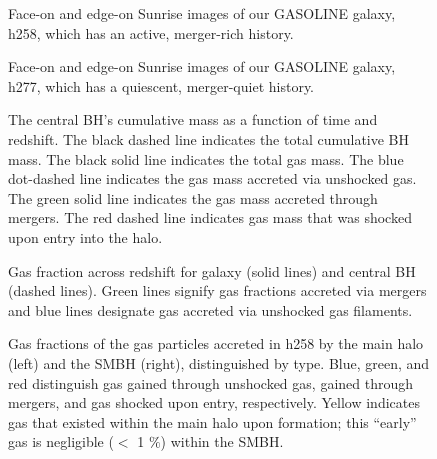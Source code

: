 \documentclass[12pt,headA,chapB]{fiskthesis}
\begin{document}
\begin{figure}
\centerline{}
\caption[GASOLINE h258]{Face-on and edge-on Sunrise images of our GASOLINE galaxy, h258, which has an active, merger-rich history.}
\label{h258face} 
\end{figure}

\begin{figure}
\centerline{}
\caption[GASOLINE h277]{Face-on and edge-on Sunrise images of our GASOLINE galaxy, h277, which has a quiescent, merger-quiet history.}
\label{h277face} 
\end{figure}

\begin{figure}
\centerline{}
\caption[GASOLINE h258 SMBH Cumulative Mass]{The central BH’s cumulative mass as a function of time and redshift. The black dashed line indicates the total cumulative BH mass. The black solid line indicates the total gas mass. The blue dot-dashed line indicates the gas mass accreted via unshocked gas. The green solid line indicates the gas mass accreted through mergers. The red dashed line indicates gas mass that was shocked upon entry into the halo.}
\label{h258allmassgas} 
\end{figure}

\begin{figure}
\centerline{}
\caption[GASOLINE h258 Galaxy and SMBH Gas Fractions Across Time]{Gas fraction across redshift for galaxy (solid lines) and central BH (dashed lines). Green lines signify gas fractions accreted via mergers and blue lines designate gas accreted via unshocked gas filaments.}
\label{h258numfrac} 
\end{figure}

\begin{figure}
\centerline{}
\caption[GASOLINE h258 Galaxy and SMBH Gas Fractions at z=0]{Gas fractions of the gas particles accreted in h258 by the main halo (left) and the SMBH (right), distinguished by type. Blue, green, and red distinguish gas gained through unshocked gas, gained through mergers, and gas shocked upon entry, respectively. Yellow indicates gas that existed within the main halo upon formation; this ``early'' gas is negligible ($<$ 1 $\%$) within the SMBH.}
\label{h258stackfrac} 
\end{figure}
\end{document}
